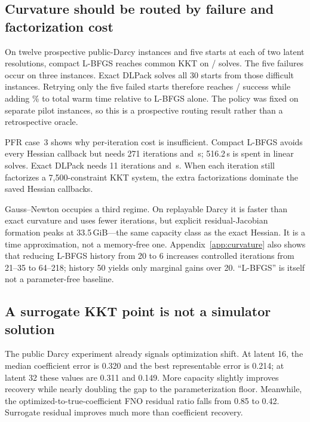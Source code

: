 \subsection{Curvature should be routed by failure and factorization cost}
\label{sec:curvature-results}

On twelve prospective public-Darcy instances and five starts at each of two
latent resolutions, compact L-BFGS reaches common KKT on
\DarcyRouteBase/\DarcyRouteTotal{} solves.  The five failures occur on three
instances.  Exact DLPack solves all 30 starts from those difficult instances.
Retrying only the five failed starts therefore reaches
\DarcyRouteTotal/\DarcyRouteTotal{} success while adding
\DarcyRouteOverhead\% to total warm time relative to L-BFGS alone.  The policy
was fixed on separate pilot instances, so this is a prospective routing result
rather than a retrospective oracle.

PFR case~3 shows why per-iteration cost is insufficient.  Compact L-BFGS avoids every
Hessian callback but needs 271 iterations and \PFRCaseThreeLBFGS\,s; 516.2\,s
is spent in linear solves.  Exact DLPack needs 11 iterations and
\PFRCaseThreeGPU\,s.  When each iteration still factorizes a 7,500-constraint
KKT system, the extra factorizations dominate the saved Hessian callbacks.

Gauss--Newton occupies a third regime.  On replayable Darcy it is faster than
exact curvature and uses fewer iterations, but explicit residual-Jacobian
formation peaks at 33.5\,GiB---the same capacity class as the exact Hessian.
It is a time approximation, not a memory-free one.  Appendix~\ref{app:curvature}
also shows that reducing L-BFGS history from 20 to 6 increases controlled
iterations from 21--35 to 64--218; history 50 yields only marginal gains over
20.  ``L-BFGS'' is itself not a parameter-free baseline.

\subsection{A surrogate KKT point is not a simulator solution}
\label{sec:validity-results}

The public Darcy experiment already signals optimization shift.  At latent 16,
the median coefficient error is 0.320 and the best representable error is
0.214; at latent 32 these values are 0.311 and 0.149.  More capacity
slightly improves recovery while nearly doubling the gap to the
parameterization floor.  Meanwhile, the optimized-to-true-coefficient FNO
residual ratio falls from 0.85 to 0.42.  Surrogate residual improves much more
than coefficient recovery.

